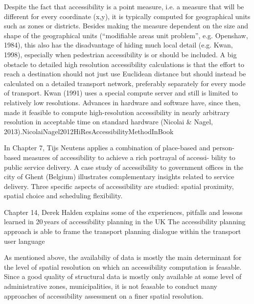 Despite the fact that accessibility is a point measure, i.e. a measure that will be different for every coordinate (x,y), 
it is typically computed for geographical units such as zones or districts. Besides making the measure dependent on the
size and shape of the geographical units (“modifiable areas unit problem”, e.g. Openshaw, 1984), this also has the 
disadvantage of hiding much local detail (e.g. Kwan, 1998), especially when pedestrian accessibility is or should be included.
A big obstacle to detailed high resolution accessibility calculations is that the effort to reach a destination should 
not just use Euclidean distance but should instead be calculated on a detailed transport network, preferably separately 
for every mode of transport. Kwan (1991) uses a special compute server and still is limited to relatively low resolutions.
Advances in hardware and software have, since then, made it feasible to compute high-resolution accessibility in nearly
arbitrary resolution in acceptable time on standard hardware (Nicolai \& Nagel, 2013).NicolaiNagel2012HiResAccessibilityMethodInBook









In Chapter 7, Tijs Neutens applies a combination of place-based and person-based measures of accessibility to achieve 
a rich portrayal of accessi- bility to public service delivery. A case study of accessibility to government offices 
in the city of Ghent (Belgium) illustrates complementary insights related to service delivery. Three specific aspects 
of accessibility are studied: spatial proximity, spatial choice and scheduling flexibility.

Chapter 14, Derek Halden explains some of the experiences, pitfalls and lessons learned in 20\,years of accessibility 
planning in the UK The accessibility planning approach is able to frame the transport planning dialogue within 
the transport user language


As mentioned above, the availabiliy of data is mostly the main determinant for the level of spatial resolution
on which an accessibility computation is feasable. Since a good quality of structural data is mostly only
available at some level of administrative zones, \eg municipalities, it is not feasable to conduct many
approaches of accessibility assessment on a finer spatial resolution.

